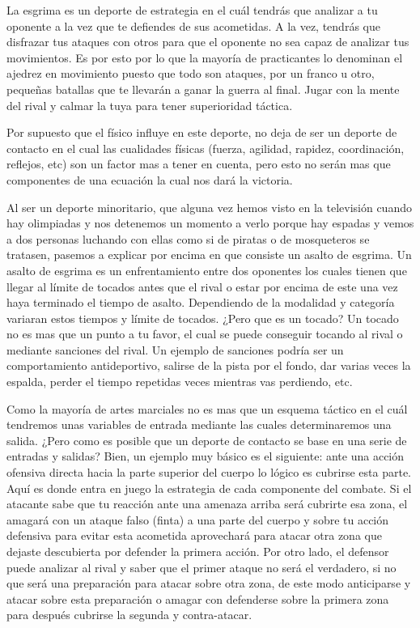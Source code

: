 La esgrima es un deporte de estrategia en el cuál tendrás que analizar a tu
 oponente a la vez que te defiendes de sus acometidas. A la vez, tendrás que
 disfrazar tus ataques con otros para que el oponente no sea capaz de analizar
 tus movimientos. Es por esto por lo que la mayoría de practicantes lo denominan
 el ajedrez en movimiento puesto que todo son ataques, por un franco u otro,
 pequeñas batallas que te llevarán a ganar la guerra al final. Jugar con la mente
 del rival y calmar la tuya para tener superioridad táctica.

Por supuesto que el físico influye en este deporte, no deja de ser un deporte de contacto
 en el cual las cualidades físicas (fuerza, agilidad, rapidez, coordinación, reflejos, etc)
 son un factor mas a tener en cuenta, pero esto no serán mas que componentes de una ecuación
 la cual nos dará la victoria.

Al ser un deporte minoritario, que alguna vez hemos visto en la televisión cuando hay
 olimpiadas y nos detenemos un momento a verlo porque hay espadas y vemos a dos personas
 luchando con ellas como si de piratas o de mosqueteros se tratasen, pasemos a explicar por encima
 en que consiste un asalto de esgrima. Un asalto de esgrima es un enfrentamiento entre dos
 oponentes los cuales tienen que llegar al límite de tocados antes que el rival o estar por encima
 de este una vez haya terminado el tiempo de asalto. Dependiendo de la modalidad y categoría
 variaran estos tiempos y límite de tocados. ¿Pero que es un tocado? Un tocado no es mas que
 un punto a tu favor, el cual se puede conseguir tocando al rival o mediante sanciones del rival.
 Un ejemplo de sanciones podría ser un comportamiento antideportivo, salirse de la pista por el fondo,
 dar varias veces la espalda, perder el tiempo repetidas veces mientras vas perdiendo, etc.

Como la mayoría de artes marciales no es mas que un esquema táctico en el cuál tendremos unas variables
 de entrada mediante las cuales determinaremos una salida. ¿Pero como es posible que un deporte de contacto
 se base en una serie de entradas y salidas? Bien, un ejemplo muy básico es el siguiente: ante una acción ofensiva
 directa hacia la parte superior del cuerpo lo lógico es cubrirse esta parte. Aquí es donde entra en juego
 la estrategia de cada componente del combate. Si el atacante sabe que tu reacción ante una amenaza arriba
 será cubrirte esa zona, el amagará con un ataque falso (finta) a una parte del cuerpo y sobre tu acción
 defensiva para evitar esta acometida aprovechará para atacar otra zona que dejaste descubierta por
 defender la primera acción. Por otro lado, el defensor puede analizar al rival y saber que el primer ataque
 no será el verdadero, si no que será una preparación para atacar sobre otra zona, de este modo anticiparse
 y atacar sobre esta preparación o amagar con defenderse sobre la primera zona para después cubrirse la segunda
 y contra-atacar.

